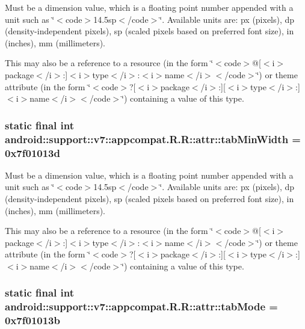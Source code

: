 Must be a dimension value, which is a floating point number appended with a unit such as \char`\"{}$<$code$>$14.5sp$<$/code$>$\char`\"{}. Available units are: px (pixels), dp (density-independent pixels), sp (scaled pixels based on preferred font size), in (inches), mm (millimeters). 

This may also be a reference to a resource (in the form \char`\"{}$<$code$>$@\mbox{[}$<$i$>$package$<$/i$>$:\mbox{]}$<$i$>$type$<$/i$>$:$<$i$>$name$<$/i$>$$<$/code$>$\char`\"{}) or theme attribute (in the form \char`\"{}$<$code$>$?\mbox{[}$<$i$>$package$<$/i$>$:\mbox{]}\mbox{[}$<$i$>$type$<$/i$>$:\mbox{]}$<$i$>$name$<$/i$>$$<$/code$>$\char`\"{}) containing a value of this type. \hypertarget{classandroid_1_1support_1_1v7_1_1appcompat_1_1_r_1_1attr_245bd7de5c3e16903d073065aa59ec58}{
\subsubsection[{tabMinWidth}]{\setlength{\rightskip}{0pt plus 5cm}static final int android::support::v7::appcompat.R.R::attr::tabMinWidth = 0x7f01013d}}
\label{classandroid_1_1support_1_1v7_1_1appcompat_1_1_r_1_1attr_245bd7de5c3e16903d073065aa59ec58}


Must be a dimension value, which is a floating point number appended with a unit such as \char`\"{}$<$code$>$14.5sp$<$/code$>$\char`\"{}. Available units are: px (pixels), dp (density-independent pixels), sp (scaled pixels based on preferred font size), in (inches), mm (millimeters). 

This may also be a reference to a resource (in the form \char`\"{}$<$code$>$@\mbox{[}$<$i$>$package$<$/i$>$:\mbox{]}$<$i$>$type$<$/i$>$:$<$i$>$name$<$/i$>$$<$/code$>$\char`\"{}) or theme attribute (in the form \char`\"{}$<$code$>$?\mbox{[}$<$i$>$package$<$/i$>$:\mbox{]}\mbox{[}$<$i$>$type$<$/i$>$:\mbox{]}$<$i$>$name$<$/i$>$$<$/code$>$\char`\"{}) containing a value of this type. \hypertarget{classandroid_1_1support_1_1v7_1_1appcompat_1_1_r_1_1attr_e9a707b6d6def3779b34e98677ee43b9}{
\subsubsection[{tabMode}]{\setlength{\rightskip}{0pt plus 5cm}static final int android::support::v7::appcompat.R.R::attr::tabMode = 0x7f01013b}}
\label{classandroid_1_1support_1_1v7_1_1appcompat_1_1_r_1_1attr_e9a707b6d6def3779b34e98677ee43b9}


